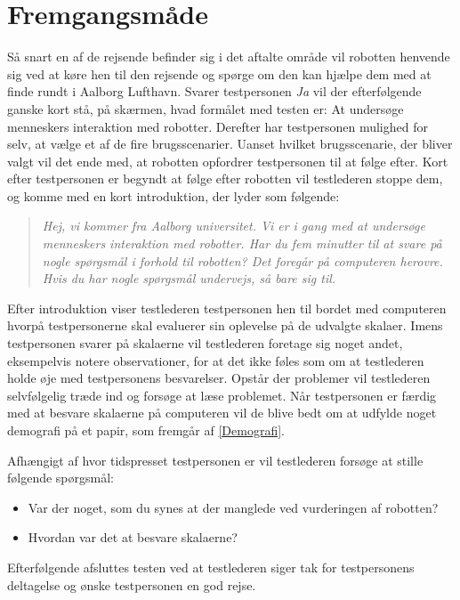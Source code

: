 \section{Fremgangsmåde}
\label{TestAfSkalaFremgangsmaade}
%
Så snart en af de rejsende befinder sig i det aftalte område vil robotten henvende sig ved at køre hen til den rejsende og spørge om den kan hjælpe dem med at finde rundt i Aalborg Lufthavn. Svarer testpersonen \textit{Ja} vil der efterfølgende ganske kort stå, på skærmen, hvad formålet med testen er: At undersøge menneskers interaktion med robotter. Derefter har testpersonen mulighed for selv, at vælge et af de fire brugsscenarier. Uanset hvilket brugsscenarie, der bliver valgt vil det ende med, at robotten opfordrer testpersonen til at følge efter. Kort efter testpersonen er begyndt at følge efter robotten vil testlederen stoppe dem, og komme med en kort introduktion, der lyder som følgende: 
%
\begin{quotation}
\noindent
\textit{Hej, vi kommer fra Aalborg universitet. Vi er i gang med at undersøge menneskers interaktion med robotter. Har du fem minutter til at svare på nogle spørgsmål i forhold til robotten? Det foregår på computeren herovre. Hvis du har nogle spørgsmål undervejs, så bare sig til.}\blankline
\end{quotation}
\noindent
%
Efter introduktion viser testlederen testpersonen hen til bordet med computeren hvorpå testpersonerne skal evaluerer sin oplevelse på de udvalgte skalaer. Imens testpersonen svarer på skalaerne vil testlederen foretage sig noget andet, eksempelvis notere observationer, for at det ikke føles som om at testlederen holde øje med testpersonens besvarelser. Opstår der problemer vil testlederen selvfølgelig træde ind og forsøge at læse problemet. Når testpersonen er færdig med at besvare skalaerne på computeren vil de blive bedt om at udfylde noget demografi på et papir, som fremgår af \autoref{Demografi}.  

Afhængigt af hvor tidspresset testpersonen er vil testlederen forsøge at stille følgende spørgsmål: \blankline
%
\begin{itemize}
	\item Var der noget, som du synes at der manglede ved vurderingen af robotten? 
	\item Hvordan var det at besvare skalaerne? 
\end{itemize} \blankline
%
Efterfølgende afsluttes testen ved at testlederen siger tak for testpersonens deltagelse og ønske testpersonen en god rejse.